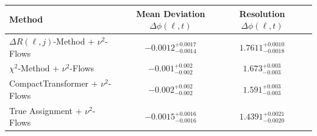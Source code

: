     \begin{tabular}{lccc}
        \toprule
        Method & Mean Deviation $\Delta\phi(\ell, t)$ & Resolution $\Delta\phi(\ell, t)$ \\
        \midrule
        $\Delta R(\ell,j)$-Method + $\nu^2$-Flows & $-0.0012^{+0.0017}_{-0.0014}$ & $1.7611^{+0.0010}_{-0.0018}$ \\
        $\chi^2$-Method + $\nu^2$-Flows & $-0.001^{+0.002}_{-0.002}$ & $1.673^{+0.003}_{-0.003}$ \\
        CompactTransformer + $\nu^2$-Flows & $-0.002^{+0.002}_{-0.002}$ & $1.591^{+0.003}_{-0.003}$ \\
        True Assignment + $\nu^2$-Flows & $-0.0015^{+0.0016}_{-0.0016}$ & $1.4391^{+0.0021}_{-0.0020}$ \\
        \bottomrule
    \end{tabular}